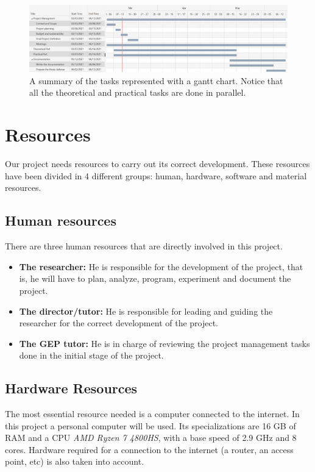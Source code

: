 \begin{figure}[H]
    \centering
    \includegraphics[scale=0.35]{gantt.png}
    \caption{A summary of the tasks represented with a gantt chart. Notice that all the theoretical and practical tasks are done in parallel.}
    \label{fig:gantt}
\end{figure}

\section{Resources}

Our project needs resources to carry out its correct development. These resources have been divided in 4 different groups: human, hardware, software and material resources.

\subsection{Human resources}

There are three human resources that are directly involved in this project.

\begin{itemize}
    \item \textbf{The researcher:} He is responsible for the development of the project, that is, he will have to plan, analyze, program, experiment and document the project.
    \item \textbf{The director/tutor:} He is responsible for leading and guiding the researcher for the correct development of the project.
    \item \textbf{The GEP tutor:} He is in charge of reviewing the project management tasks done in the initial stage of the project.
\end{itemize}

\subsection{Hardware Resources}

The most essential resource needed is a computer connected to the internet. In this project a personal computer will be used. Its specializations are 16 GB of RAM and a CPU \emph{AMD Ryzen 7 4800HS}, with a base speed of 2.9 GHz and 8 cores. Hardware required for a connection to the internet (a router, an access point, etc) is also taken into account.

